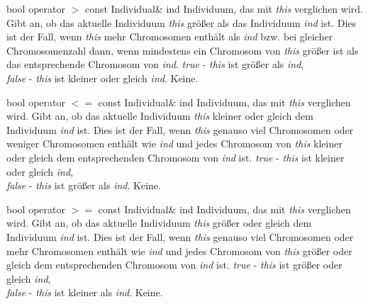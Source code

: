 \documentclass{report}
\begin{document}
\newpage

\setConstInstance
\printMethodWithOneParam
{bool}
{operator $>$}
{const Individual\&}
{ind}
{Individuum, das mit {\em this} verglichen wird.}    
{Gibt an, ob das aktuelle Individuum {\em this}
    gr\"o{\ss}er als das Individuum {\em ind} ist. Dies ist der Fall, wenn 
    {\em this} mehr Chromosomen enth\"alt als {\em ind} bzw. bei
    gleicher Chromosomenzahl dann, wenn mindestens ein Chromosom
    von {\em this} gr\"o{\ss}er ist als das entsprechende Chromosom
    von {\em ind}.}
{
 {\em true}  - {\em this} ist gr\"o{\ss}er als {\em ind},\\
 {\em false} - {\em this} ist kleiner oder gleich {\em ind}.}
{Keine.}

\vspace{4ex}

\setConstInstance
\printMethodWithOneParam
{bool}
{operator $<=$}
{const Individual\&}
{ind}
{Individuum, das mit {\em this} verglichen wird.}    
{Gibt an, ob das aktuelle Individuum {\em this}
    kleiner oder gleich dem Individuum {\em ind} ist. Dies ist der Fall,    
    wenn {\em this} genauso viel Chromosomen oder weniger Chromosomen 
    enth\"alt 
    wie {\em ind} und jedes Chromosom von {\em this} kleiner oder
    gleich dem entsprechenden Chromosom von {\em ind} ist.}
{
 {\em true}  - {\em this} ist kleiner oder gleich {\em ind},\\
 {\em false} - {\em this} ist gr\"o{\ss}er als {\em ind}.}
{Keine.}

\vspace{4ex}

\setConstInstance
\printMethodWithOneParam
{bool}
{operator $>=$}
{const Individual\&}
{ind}
{Individuum, das mit {\em this} verglichen wird.}    
{Gibt an, ob das aktuelle Individuum {\em this}
    gr\"o{\ss}er oder gleich dem Individuum {\em ind} ist. Dies ist der Fall,    wenn {\em this} genauso viel Chromosomen oder mehr Chromosomen enth\"alt 
    wie {\em ind} und jedes Chromosom von {\em this} gr\"o{\ss}er oder
    gleich dem entsprechenden Chromosom von {\em ind} ist.}
{
 {\em true}  - {\em this} ist gr\"o{\ss}er oder gleich {\em ind},\\
 {\em false} - {\em this} ist kleiner als {\em ind}.}
{Keine.}
\end{document}
